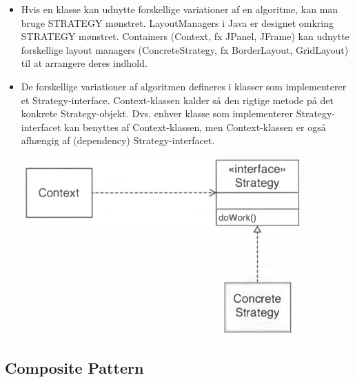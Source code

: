 \begin{itemize}
  \item Hvis en klasse kan udnytte forskellige variationer af en algoritme, kan man bruge STRATEGY mønstret. LayoutManagers i Java er designet omkring STRATEGY mønstret. Containers (Context, fx JPanel, JFrame) kan udnytte forskellige layout managers (ConcreteStrategy, fx BorderLayout, GridLayout) til at arrangere deres indhold.
  \item De forskellige variationer af algoritmen defineres i klasser som implementerer et Strategy-interface. Context-klassen kalder så den rigtige metode på det konkrete Strategy-objekt. Dvs. enhver klasse som implementerer Strategy-interfacet kan benyttes af Context-klassen, men Context-klassen er også afhængig af (dependency) Strategy-interfacet.
  
  \begin{center}
    \includegraphics[scale=0.7]{images/strategy_horstman.png}
  \end{center}

\end{itemize}

\subsection{Composite Pattern}

